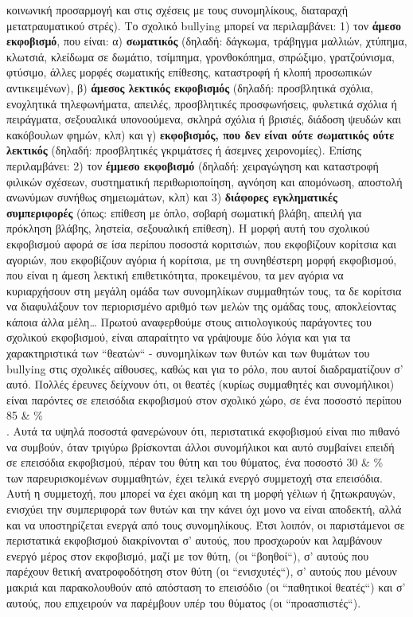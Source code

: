 \documentclass[12pt,a4paper]{book}
\begin{document}
κοινωνική προσαρμογή και στις σχέσεις με τους συνομηλίκους, διαταραχή
μετατραυματικού στρές).
\newline\setlength{\parindent}{20pt}\indent Το σχολικό bullying μπορεί να
περιλαμβάνει: 1) τον \textbf{άμεσο εκφοβισμό}, που είναι: α) \textbf{σωματικός}
(δηλαδή: δάγκωμα, τράβηγμα μαλλιών, χτύπημα, κλωτσιά, κλείδωμα σε δωμάτιο,
τσίμπημα, γρονθοκόπημα, σπρώξιμο, γρατζούνισμα, φτύσιμο, άλλες μορφές σωματικής
επίθεσης, καταστροφή ή κλοπή προσωπικών αντικειμένων), β) \textbf{άμεσος
λεκτικός εκφοβισμός} (δηλαδή: προσβλητικά σχόλια, ενοχλητικά τηλεφωνήματα,
απειλές, προσβλητικές προσφωνήσεις, φυλετικά σχόλια ή πειράγματα, σεξουαλικά
υπονοούμενα, σκληρά σχόλια ή βρισιές, διάδοση ψευδών και κακόβουλων φημών,
κλπ) και γ) \textbf{εκφοβισμός, που δεν είναι ούτε σωματικός ούτε λεκτικός}
(δηλαδή: προσβλητικές γκριμάτσες ή άσεμνες χειρονομίες). Επίσης περιλαμβάνει: 2)
τον \textbf{έμμεσο εκφοβισμό} (δηλαδή: χειραγώγηση και καταστροφή φιλικών
σχέσεων, συστηματική περιθωριοποίηση, αγνόηση και απομόνωση, αποστολή ανωνύμων
συνήθως σημειωμάτων, κλπ) και 3) \textbf{διάφορες εγκληματικές συμπεριφορές}
(όπως: επίθεση με όπλο, σοβαρή σωματική βλάβη, απειλή για πρόκληση βλάβης,
ληστεία, σεξουαλική επίθεση).
\newline\setlength{\parindent}{20pt}\indent Η μορφή αυτή του σχολικού εκφοβισμού
αφορά σε ίσα περίπου ποσοστά κοριτσιών, που εκφοβίζουν κορίτσια και αγοριών, που
εκφοβίζουν αγόρια ή κορίτσια, με τη συνηθέστερη μορφή εκφοβισμού, που είναι η
άμεση λεκτική επιθετικότητα, προκειμένου, τα μεν αγόρια να κυριαρχήσουν στη
μεγάλη ομάδα των συνομηλίκων συμμαθητών τους, τα δε κορίτσια να διαφυλάξουν
τον περιορισμένο αριθμό των μελών της ομάδας τους,  αποκλείοντας κάποια άλλα
μέλη\ldots
\newline\setlength{\parindent}{20pt}\indent Πρωτού αναφερθούμε στους
αιτιολογικούς παράγοντες του σχολικού εκφοβισμού, είναι απαραίτητο να γράψουμε
δύο λόγια και για τα χαρακτηριστικά των ``θεατών`` - συνομηλίκων των θυτών και
των θυμάτων του bullying στις σχολικές αίθουσες, καθώς και για το ρόλο, που
αυτοί διαδραματίζουν σ' αυτό. Πολλές έρευνες δείχνουν ότι, οι θεατές (κυρίως
συμμαθητές και συνομήλικοι) είναι παρόντες σε επεισόδια εκφοβισμού στον σχολικό
χώρο, σε ένα ποσοστό περίπου \num{85} & \% \\. Αυτά τα υψηλά ποσοστά φανερώνουν
ότι, περιστατικά εκφοβισμού είναι πιο πιθανό να συμβούν, όταν τριγύρω βρίσκονται
άλλοι συνομήλικοι  και αυτό συμβαίνει επειδή σε επεισόδια εκφοβισμού, πέραν του
θύτη και του θύματος, ένα ποσοστό \num{30} & \% \\ των παρευρισκομένων
συμμαθητών, έχει τελικά ενεργό συμμετοχή στα επεισόδια. Αυτή η συμμετοχή, που
μπορεί να έχει ακόμη και τη μορφή γέλιων ή ζητωκραυγών, ενισχύει την συμπεριφορά
των θυτών και την κάνει όχι μονο να είναι αποδεκτή, αλλά και να υποστηρίζεται
ενεργά από τους συνομηλίκους. Έτσι λοιπόν, οι παριστάμενοι σε περιστατικά
εκφοβισμού διακρίνονται σ' αυτούς, που προσχωρούν και λαμβάνουν ενεργό μέρος
στον εκφοβισμό, μαζί με τον θύτη, (οι ``βοηθοί``), σ' αυτούς που παρέχουν θετική
ανατροφοδότηση στον θύτη (οι ``ενισχυτές``), σ' αυτούς που μένουν μακριά και
παρακολουθούν από απόσταση το επεισόδιο (οι ``παθητικοί θεατές``) και σ' αυτούς,
που επιχειρούν να παρέμβουν υπέρ του θύματος (οι ``προασπιστές``).
\end{document}
